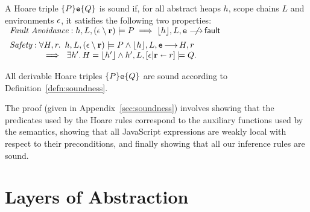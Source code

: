 \documentclass{article}
\newcommand{\iflong}[1]{#1}
\newcommand{\ifshort}[1]{}
\begin{document}
\begin{defn}
        \label{defn:soundness}
A Hoare triple $\{P\}\mbox{\texttt{{\upshape e}}}\{Q\}$ is sound if, for all abstract heaps $h$,
scope chains $L$ and environments $\epsilon$, it satisfies the following two properties:\\[\gap]
%
$\begin{array}{l}
\textit{Fault Avoidance}: h,L,(\env\setminus\rv) \satisfies P \implies \heval{h},L,\js e  \;\;  \not\!\!\!\!\!\!\levalsto \fault\\[\gap]
\textit{Safety}: \forall H,r\st~h,L,(\env\setminus\rv) \satisfies P \land \heval{h},L,\js e \levalsto H,r \\
~~~~~~~~~~~~\implies~\exists h' \st H=\heval{h'} \land h',L,[\env|\rv\takes r] \satisfies Q.
\end{array}$
\end{defn}
%

%
\begin{thm}[Soundness]
        All derivable Hoare triples $\{P\}\mbox{\texttt{{\upshape e}}}\{Q\}$ are sound according to Definition~\ref{defn:soundness}.
\end{thm}
%
The proof (\ifshort{reported in~\cite{proofs}}\iflong{given in Appendix~\ref{sec:soundness}}) involves showing that the
predicates used by the Hoare rules correspond to the auxiliary
functions used by the semantics, showing that all JavaScript
expressions are weakly local with respect to their preconditions,  and
finally showing that all our inference rules are sound.









\section{Layers of Abstraction}\label{sec:examples}
\end{document}
